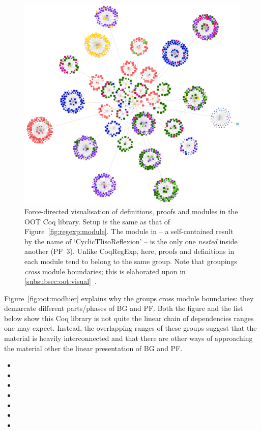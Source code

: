 \begin{figure}[tp]
\centering
\includegraphics[height=0.35\textheight]{img/oot/modules}
\caption{Force-directed visualisation of definitions, proofs and modules in
  the OOT Coq library. Setup is the same as that of
  Figure~\ref{fig:regexp:module}. The module in  --
  a self-contained result by the name of `CyclicTIisoReflexion' -- is
  the only one \emph{nested} inside another (PF~3). Unlike CoqRegExp, here,
  proofs and definitions in each module tend to belong to the same group. Note
  that groupings \emph{cross} module boundaries; this is elaborated upon in
  \ref{subsubsec:oot:visual}~.}\label{fig:oot:module}
\end{figure}

Figure~\ref{fig:oot:modhier} explains why the groups cross module boundaries:
they demarcate different parts/phases of BG and PF. Both the figure and the list
below show this Coq library is not quite the linear chain of dependencies ranges
one may expect. Instead, the overlapping ranges of these groups suggest that the
material is heavily interconnected and that there are other ways of approaching
the material other the linear presentation of BG and PF.

\begin{itemize}
  \item {}
  \item {}
  \item {}
  \item {}
  \item {}
  \item {}
  \item {}
\end{itemize}

